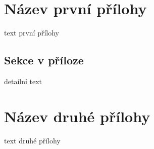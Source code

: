 \documentclass[
BP,bw,print,a4paper,11pt,fonts,numbering,twoside,margins,longappendices,italiccaps
]{./tulpackage/tulthesis}
\begin{document}

\cleardoublepage%


\begin{TULthesisAppendix}

\TULthesisLOA%

\chapter{Název první přílohy}
text první přílohy

\section{Sekce v příloze}
detailní text

\cleardoublepage%

\chapter{Název druhé přílohy}
text druhé přílohy

\end{TULthesisAppendix}
\end{document}
